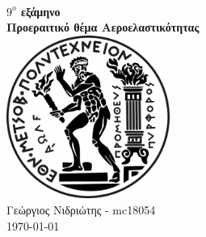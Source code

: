 \begin{center}
    \vspace{4cm}
    \huge
    \textbf{\myClass}\\
    \textbf{ {$9^o$} εξάμηνο} \\
    \vspace{1cm}
    \LARGE
    \textbf{Προεραιτικό θέμα Αεροελαστικότητας}\\
    \vspace{0.5cm}
    \LARGE
    \myTitle  \vfill
    \includegraphics[width=0.4\textwidth]{pyrforos_bw.jpg}\\
    \vspace{4cm}
    \Large
    Γεώργιος Νιδριώτης  - mc18054\\

    \today
    \vspace{2cm}
\end{center}
